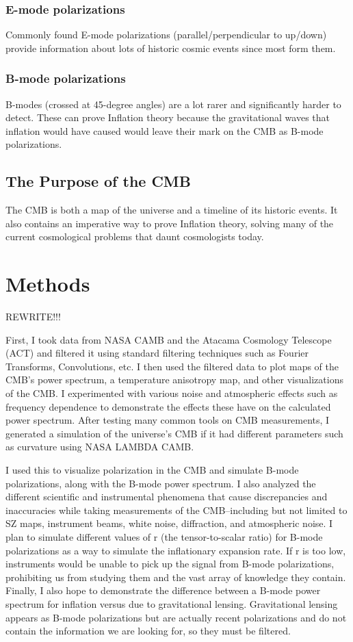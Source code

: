 \documentclass[12pt]{article}
\begin{document}
\subsubsection{E-mode polarizations}
Commonly found E-mode polarizations (parallel/perpendicular to up/down) provide information about lots of historic cosmic events since most form them.

\subsubsection{B-mode polarizations}
B-modes (crossed at 45-degree angles) are a lot rarer and significantly harder to detect. These can prove Inflation theory because the gravitational waves that inflation would have caused would leave their mark on the CMB as B-mode polarizations.

\subsection{The Purpose of the CMB}
The CMB is both a map of the universe and a timeline of its historic events. It also contains an imperative way to prove Inflation theory, solving many of the current cosmological problems that daunt cosmologists today.

\section{Methods}
REWRITE!!!

First, I took data from NASA CAMB and the Atacama Cosmology Telescope (ACT) and filtered it using standard filtering techniques such as Fourier Transforms, Convolutions, etc. I then used the filtered data to plot maps of the CMB’s power spectrum, a temperature anisotropy map, and other visualizations of the CMB. I experimented with various noise and atmospheric effects such as frequency dependence to demonstrate the effects these have on the calculated power spectrum. After testing many common tools on CMB measurements, I generated a simulation of the universe’s CMB if it had different parameters such as curvature using NASA LAMBDA CAMB.

I used this to visualize polarization in the CMB and simulate B-mode polarizations, along with the B-mode power spectrum. I also analyzed the different scientific and instrumental phenomena that cause discrepancies and inaccuracies while taking measurements of the CMB–including but not limited to SZ maps, instrument beams, white noise, diffraction, and atmospheric noise. I plan to simulate different values of r (the tensor-to-scalar ratio) for B-mode polarizations as a way to simulate the inflationary expansion rate. If r is too low, instruments would be unable to pick up the signal from B-mode polarizations, prohibiting us from studying them and the vast array of knowledge they contain. Finally, I also hope to demonstrate the difference between a B-mode power spectrum for inflation versus due to gravitational lensing. Gravitational lensing appears as B-mode polarizations but are actually recent polarizations and do not contain the information we are looking for, so they must be filtered.
\end{document}

